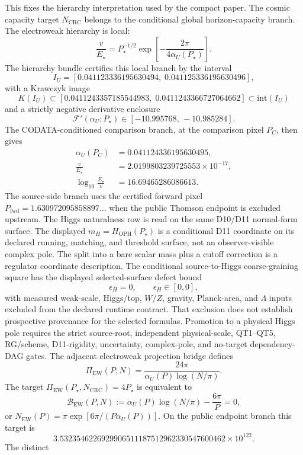 \documentclass[11pt]{article}
\begin{document}
This fixes the hierarchy interpretation used by the compact paper. The cosmic capacity target
\(N_{\mathrm{CRC}}\) belongs to the conditional global horizon-capacity branch. The electroweak hierarchy is
local:
\[
\frac{v}{E_\star}
=
P_\star^{-1/2}
\exp\!\left[-\frac{2\pi}{4\alpha_U(P_\star)}\right].
\]
The hierarchy bundle certifies this local branch by the interval
\[
I_U=[0.041123336195630494,\;0.041125336195630496],
\]
with a Krawczyk image
\[
K(I_U)\subset
[0.0411243357185544983,\;0.0411243366727064662]
\subset \mathrm{int}(I_U)
\]
and a strictly negative derivative enclosure
\[
\mathcal F'(\alpha_U;P_\star)\in[-10.995768,\,-10.985284].
\]
The CODATA-conditioned comparison branch, at the comparison pixel \(P_C\), then gives
\[
\begin{aligned}
\alpha_U(P_C)&=0.041124336195630495,\\
\frac{v}{E_\star}&=2.0199803239725553\times10^{-17},\\
\log_{10}\frac{E_\star}{v}&=16.69465286086613.
\end{aligned}
\]
The source-side branch uses the certified forward pixel
\(P_{\mathrm{fwd}}=1.630972095858897\ldots\) when the public Thomson endpoint
is excluded upstream.
The Higgs naturalness row is read on the same D10/D11 normal-form surface. The displayed
\(m_H=H_{\mathrm{OPH}}(P_\star)\) is a conditional D11 coordinate on its declared
running, matching, and threshold surface, not an observer-visible complex pole. The split
into a bare scalar mass plus a cutoff correction is a regulator coordinate description. The
conditional source-to-Higgs coarse-graining square has the displayed selected-surface defect bound
\[
\epsilon_H=0,\qquad \epsilon_H\in[0,0],
\]
with measured weak-scale, Higgs/top, \(W/Z\), gravity, Planck-area, and \(\Lambda\) inputs
excluded from the declared runtime contract.  That exclusion does not establish prospective
provenance for the selected formulas. Promotion to a physical Higgs pole requires the
strict source-root, independent physical-scale, QT1--QT5, RG/scheme, D11-rigidity,
uncertainty, complex-pole, and no-target dependency-DAG gates.
The adjacent electroweak projection bridge defines
\[
\Pi_{\mathrm{EW}}(P,N)
=
\frac{24\pi}{\alpha_U(P)\log(N/\pi)}.
\]
The target \(\Pi_{\mathrm{EW}}(P_\star,N_{\mathrm{CRC}})=4P_\star\) is equivalent to
\[
\mathcal B_{\mathrm{EW}}(P,N)
:=
\alpha_U(P)\log(N/\pi)-\frac{6\pi}{P}=0,
\]
or \(N_{\mathrm{EW}}(P)=\pi\exp[6\pi/(P\alpha_U(P))]\). On the public endpoint branch this
target is
\[
3.5323546226929906511187512962330547600462\times10^{122}.
\]
The distinct
\end{document}
